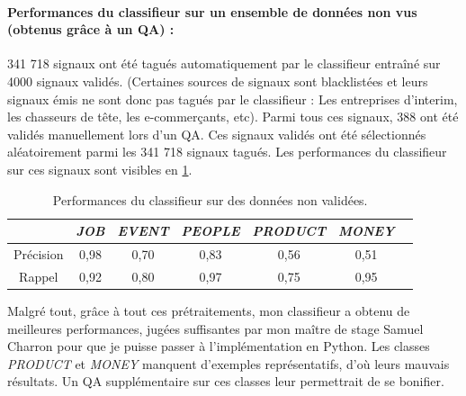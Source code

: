                 \paragraph{Performances du classifieur sur un ensemble de données non vus (obtenus grâce à un QA) :}
                    341 718 signaux ont été tagués automatiquement par le classifieur entraîné sur 4000 signaux validés.
                    (Certaines sources de signaux sont blacklistées et leurs signaux émis ne sont donc pas tagués par le classifieur : Les entreprises d'interim, les chasseurs de tête, les e-commerçants, etc). Parmi tous ces signaux, 388 ont été validés manuellement lors d'un QA. Ces signaux validés ont été sélectionnés aléatoirement parmi les 341 718 signaux tagués. Les performances du classifieur sur ces signaux sont visibles en \ref{tab:classif_perf4}.
                    \begin{table}[t]
                        \centering
                        \begin{tabular}{| c | c | c | c | c | c | c |}
                            \hline
                             & \textit{JOB} & \textit{EVENT} & \textit{PEOPLE} & \textit{PRODUCT} & \textit{MONEY} \\
                            \hline
                            Précision & 0,98 & 0,70 & 0,83 & 0,56 & 0,51 \\
                            Rappel & 0,92 & 0,80 & 0,97 & 0,75 & 0,95 \\
                            \hline
                        \end{tabular}
                        \caption{Performances du classifieur sur des données non validées.}
                        \label{tab:classif_perf4}
                    \end{table}

                Malgré tout, grâce à tout ces prétraitements, mon classifieur a obtenu de meilleures performances, jugées suffisantes par mon maître de stage Samuel Charron pour que je puisse passer à l'implémentation en Python. Les classes \textit{PRODUCT} et \textit{MONEY} manquent d'exemples représentatifs, d'où leurs mauvais résultats. Un QA supplémentaire sur ces classes leur permettrait de se bonifier.